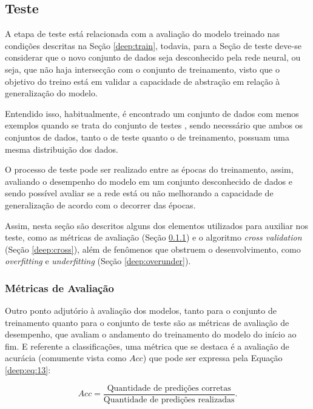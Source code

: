 \subsection{Teste}
\label{deep:test}

A etapa de teste está relacionada com a avaliação do modelo treinado nas condições descritas na Seção \ref{deep:train}, todavia, para a Seção de teste deve-se considerar que o novo conjunto de dados seja desconhecido pela rede neural, ou seja, que não haja intersecção com o conjunto de treinamento, visto que o objetivo do treino está em validar a capacidade de abstração em relação à generalização do modelo.

Entendido isso, habitualmente, é encontrado um conjunto de dados com menos exemplos quando se trata do conjunto de testes \citep{Goodfellow2016}, sendo necessário que ambos os conjuntos de dados, tanto o de teste quanto o de treinamento, possuam uma mesma distribuição dos dados.

O processo de teste pode ser realizado entre as épocas do treinamento, assim, avaliando o desempenho do modelo em um conjunto desconhecido de dados e sendo possível avaliar se a rede está ou não melhorando a capacidade de generalização de acordo com o decorrer das épocas.

Assim, nesta seção são descritos alguns dos elementos utilizados para auxiliar nos teste, como as métricas de avaliação (Seção \ref{deep:metrics}) e o algoritmo \textit{cross validation} (Seção \ref{deep:cross}), além de fenômenos que obstruem o desenvolvimento, como \textit{overfitting} e \textit{underfitting} (Seção \ref{deep:overunder}).


\subsubsection{Métricas de Avaliação}
\label{deep:metrics}

Outro ponto adjutório à avaliação dos modelos, tanto para o conjunto de treinamento quanto para o conjunto de teste são as métricas de avaliação de desempenho, que avaliam o andamento do treinamento do modelo do início ao fim. E referente a classificações, uma métrica que se destaca é a avaliação de acurácia (comumente vista como $Acc$) que pode ser expressa pela Equação \ref{deep:eq:13}:

\begin{equation}
    \label{deep:eq:13}
    Acc = \frac{\text{Quantidade de predições corretas}}{\text{Quantidade de predições realizadas}}.
\end{equation}


